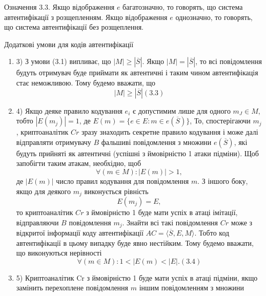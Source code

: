 \begin{definition}
    Означення 3.3. Якщо відображення $e$ багатозначно, то говорять, що система
    автентифікації з розщепленням. Якщо відображення $e$ однозначно, то
    говорять, що система автентифікації без розщеплення.
\end{definition}

Додаткові умови для кодів автентифікації

\begin{enumerate}
    \item 3) З умови (3.1) випливає, що $|M| \geqslant |\overline{S}|$. Якщо $|M| = |\overline{S}|$, то всі повідомлення
    будуть отримувач буде приймати як автентичні і таким чином
    автентифікація стає неможливою. Тому будемо вважати, що
    \begin{equation}
        |M| \geqslant |\overline{S}| (3.3)
    \end{equation}
    \item 4) Якщо деяке правило кодування $e_i$ є допустимим лише для одного $m_J \in M$,
    тобто $|E(m_j)| = 1$, де $E(m) = \{e \in E: m \in e(\overline{S})\}$, То, спостерігаючи $m_j$,
    криптоаналітик $Cr$ зразу знаходить секретне правило кодування і може далі
    відправляти отримувачу $B$ фальшиві повідомлення з множини $e(\overline{S})$, які
    будуть прийняті як автентичні (успішні з ймовірністю 1 атаки підміни).
    Щоб запобігти таким атакам, необхідно, щоб
    \begin{equation*}
        \forall (m \in M): |E(m)| > 1,
    \end{equation*}
    де $|E(m)|$ число правил кодування для повідомлення $m$.
    З іншого боку, якщо для деякого $m_j$ виконується рівність
    \begin{equation*}
        E(m_j) = E,
    \end{equation*}
    то криптоаналітик $Cr$ з ймовірністю 1 буде мати успіх в атаці імітації,
    відправляючи $B$ повідомлення $m_j$. Знайти всі такі повідомлення $Cr$ може з
    відкритої інформації коду автентифікації $AC = \langle \overline{S}, E, M \rangle$. Тобто код
    автентифікації в цьому випадку буде явно нестійким. Тому будемо вважати,
    що виконуються нерівності
    \begin{equation}
        \forall (m \in M): 1 < |E(m) < |E|. (3.4)
    \end{equation}
    \item 5) Криптоаналітик Cr з ймовірністю 1 буде мати успіх в атаці підміни, якщо
    замінить перехоплене повідомлення $m$ іншим повідомленням з множини

\end{enumerate}
